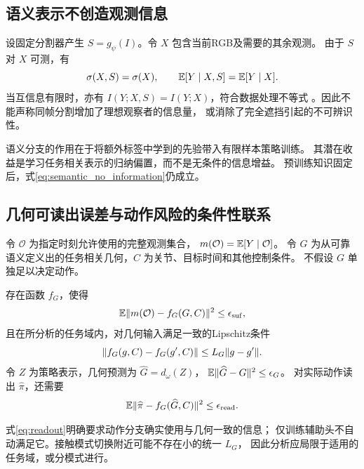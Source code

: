 \subsection{语义表示不创造观测信息}

设固定分割器产生 $S=g_\psi(I)$。令 $X$ 包含当前RGB及需要的其余观测。
由于 $S$ 对 $X$ 可测，有
\begin{equation}
 \sigma(X,S)=\sigma(X),\qquad
 \mathbb{E}[Y\mid X,S]=\mathbb{E}[Y\mid X].
 \label{eq:semantic_no_information}
\end{equation}
当互信息有限时，亦有 $I(Y;X,S)=I(Y;X)$，符合数据处理不等式
\cite{mezard2009information}。因此不能声称同帧分割增加了理想观察者的信息量，
或消除了完全遮挡引起的不可辨识性。

语义分支的作用在于将额外标签中学到的先验带入有限样本策略训练。
其潜在收益是学习任务相关表示的归纳偏置，而不是无条件的信息增益。
预训练知识固定后，式\eqref{eq:semantic_no_information}仍成立。

\subsection{几何可读出误差与动作风险的条件性联系}

令 $\mathcal O$ 为指定时刻允许使用的完整观测集合，
$m(\mathcal O)=\mathbb{E}[Y\mid\mathcal O]$。
令 $G$ 为从可靠语义定义出的任务相关几何，$C$ 为关节、目标时间和其他控制条件。
不假设 $G$ 单独足以决定动作。

\begin{assumption}[近似任务相关性与局部平滑性]
\label{ass:semantic}
存在函数 $f_G$，使得
\begin{equation}
 \mathbb{E}\lVert m(\mathcal O)-f_G(G,C)\rVert^2\leq\epsilon_{\mathrm{suf}},
 \label{eq:sufficiency}
\end{equation}
且在所分析的任务域内，对几何输入满足一致的Lipschitz条件
\begin{equation}
 \lVert f_G(g,C)-f_G(g',C)\rVert\leq L_G\lVert g-g'\rVert.
\end{equation}
令 $Z$ 为策略表示，几何预测为 $\widehat G=d_\omega(Z)$，
$\mathbb{E}\lVert\widehat G-G\rVert^2\leq\epsilon_G$。
对实际动作读出 $\widehat\pi$，还需要
\begin{equation}
 \mathbb{E}\lVert\widehat\pi-f_G(\widehat G,C)\rVert^2\leq\epsilon_{\mathrm{read}}.
 \label{eq:readout}
\end{equation}
\end{assumption}

式\eqref{eq:readout}明确要求动作分支确实使用与几何一致的信息；
仅训练辅助头不自动满足它。接触模式切换附近可能不存在小的统一 $L_G$，
因此分析应局限于适用的任务域，或分模式进行。

